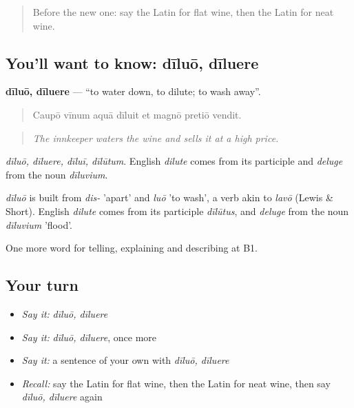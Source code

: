 \begin{quote}
Before the new one: say the Latin for flat wine, then the Latin for neat wine.
\end{quote}

\subsection*{You'll want to know: dīluō, dīluere}
\textbf{dīluō, dīluere} — \textquotedblleft{}to water down, to dilute; to wash away\textquotedblright{}.

\begin{quote}
Caupō vīnum aquā dīluit et magnō pretiō vendit.
\end{quote}

\begin{quote}
\emph{The innkeeper waters the wine and sells it at a high price.}
\end{quote}

\emph{dīluō, dīluere, dīluī, dīlūtum}. English \emph{dilute} comes from its participle and \emph{deluge} from the noun \emph{dīluvium}.

\begin{cousinweb}
\emph{dīluō} is built from \emph{dis-} 'apart' and \emph{luō} 'to wash', a verb akin to \emph{lavō} (Lewis \& Short). English \emph{dilute} comes from its participle \emph{dīlūtus}, and \emph{deluge} from the noun \emph{dīluvium} 'flood'.
\end{cousinweb}

\begin{grammarlens}[title={What you've built}]
One more word for telling, explaining and describing at B1.
\end{grammarlens}

\subsection*{Your turn}
\begin{itemize}
\raggedright
  \item \emph{Say it:} \emph{dīluō, dīluere}
  \item \emph{Say it:} \emph{dīluō, dīluere}, once more
  \item \emph{Say it:} a sentence of your own with \emph{dīluō, dīluere}
  \item \emph{Recall:} say the Latin for flat wine, then the Latin for neat wine, then say \emph{dīluō, dīluere} again
\end{itemize}

